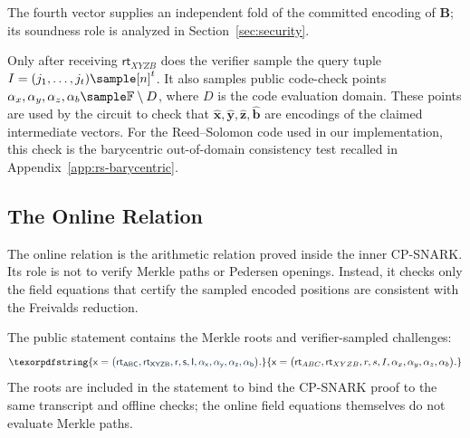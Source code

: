 \documentclass[conference,compsoc]{IEEEtran}
\newcommand{\rt}{\textsf{rt}}
\newcommand{\mat}{\mathbf}          %
\newcommand{\vect}{\mathbf}         %
\newcommand{\stmt}{\mathsf{x}}      %
\theoremstyle{plain}
\theoremstyle{definition}
\theoremstyle{remark}
\providecommand{\DIFaddtex}[1]{{\protect\color{DIFADD} \sf #1}} %
\providecommand{\DIFaddbegin}{} %
\providecommand{\DIFaddend}{} %
\providecommand{\DIFadd}[1]{\texorpdfstring{\DIFaddtex{#1}}{#1}} %
\providecommand{\DIFaddincludegraphics}[2][]{{\color{blue}\fbox{\DIFOincludegraphics[#1]{#2}}}} %
\DeclareRobustCommand{\DIFaddbegin}{\DIFOaddbegin \let\includegraphics\DIFaddincludegraphics} %
\DeclareRobustCommand{\DIFaddend}{\DIFOaddend \let\includegraphics\DIFOincludegraphics} %
\begin{document}
\DIFaddbegin \DIFadd{The fourth vector supplies an independent fold of the committed encoding of
\(\mat{B}\); its soundness role is analyzed in Section~\ref{sec:security}.
}

\DIFaddend Only after receiving  \DIFaddbegin \DIFadd{\(\rt_{XYZB}\) }\DIFaddend does the verifier sample the query tuple
{\footnotesize \(I=(j_1,\ldots,j_t)\sample [n]^t\).}
It also samples public code-check points
{\footnotesize
 \DIFaddbegin \DIFadd{\(\alpha_x,\alpha_y,\alpha_z,\alpha_b\sample\mathbb{F}\setminus D\)}\DIFaddend ,
}
where \(D\) is the
code evaluation domain. These points are used by the circuit to check that
{\footnotesize
 \DIFaddbegin \DIFadd{\(\widehat{\vect{x}},\widehat{\vect{y}},\widehat{\vect{z}},
\widehat{\vect{b}}\)
}\DIFaddend }
are encodings of
the claimed intermediate vectors. For the Reed--Solomon code used in our
implementation, this check is the barycentric out-of-domain consistency test
recalled in Appendix~\ref{app:rs-barycentric}.


\subsection{The Online Relation}
\label{sec:snark-relation}
The online relation is the arithmetic relation proved inside the
inner CP-SNARK.  Its role is not to verify Merkle paths or Pedersen openings.
Instead, it checks only the field equations that certify the sampled encoded
positions are consistent with the Freivalds reduction.

The public statement contains the Merkle roots and verifier-sampled
challenges:
 \DIFaddbegin \[
\DIFadd{\stmt = \big( \rt_{ABC},\rt_{XYZB},r,s,I,\alpha_x,\alpha_y,\alpha_z,\alpha_b
  \big).
}\]\DIFaddend 
The roots are included in the statement to bind the CP-SNARK proof to the same
transcript and offline checks; the online field equations themselves do not
evaluate Merkle paths.
\end{document}
